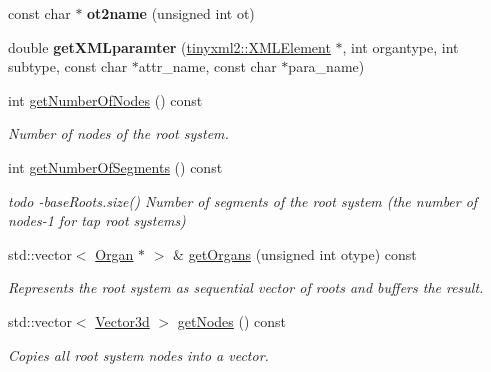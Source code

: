 \begin{DoxyCompactItemize}
\mbox{\label{classCPlantBox_1_1Plant_af972b74126d040862f1f3cc3429cd1d5}} 
const char $\ast$ {\bfseries ot2name} (unsigned int ot)
\item 
\mbox{\label{classCPlantBox_1_1Plant_a2656c5ee33d3566617e95badadf03d41}} 
double {\bfseries get\+X\+M\+Lparamter} (\hyperlink{classCPlantBox_1_1tinyxml2_1_1XMLElement}{tinyxml2\+::\+X\+M\+L\+Element} $\ast$, int organtype, int subtype, const char $\ast$attr\+\_\+name, const char $\ast$para\+\_\+name)
\item 
\mbox{\label{classCPlantBox_1_1Plant_aadbd0ba47ffca8dd2107412e22bc7452}} 
int \hyperlink{classCPlantBox_1_1Plant_aadbd0ba47ffca8dd2107412e22bc7452}{get\+Number\+Of\+Nodes} () const
\begin{DoxyCompactList}\small\item\em Number of nodes of the root system. \end{DoxyCompactList}\item 
\mbox{\label{classCPlantBox_1_1Plant_a7dfdb56e1f4ff3bf84c9cfd569d89975}} 
int \hyperlink{classCPlantBox_1_1Plant_a7dfdb56e1f4ff3bf84c9cfd569d89975}{get\+Number\+Of\+Segments} () const
\begin{DoxyCompactList}\small\item\em todo -\/base\+Roots.\+size() Number of segments of the root system (the number of nodes-\/1 for tap root systems) \end{DoxyCompactList}\item 
std\+::vector$<$ \hyperlink{classCPlantBox_1_1Organ}{Organ} $\ast$ $>$ \& \hyperlink{classCPlantBox_1_1Plant_a035d0e26fbeb802896834dd73d4fcd22}{get\+Organs} (unsigned int otype) const
\begin{DoxyCompactList}\small\item\em Represents the root system as sequential vector of roots and buffers the result. \end{DoxyCompactList}\item 
std\+::vector$<$ \hyperlink{classCPlantBox_1_1Vector3d}{Vector3d} $>$ \hyperlink{classCPlantBox_1_1Plant_ae6730cc4a8296f575f597eb7f2e3cb2f}{get\+Nodes} () const
\begin{DoxyCompactList}\small\item\em Copies all root system nodes into a vector. \end{DoxyCompactList}\item 

\end{DoxyCompactItemize}
